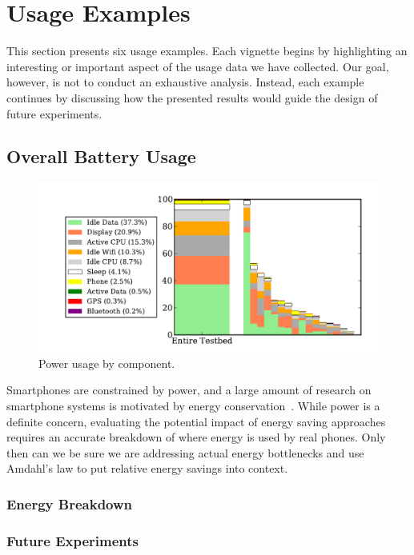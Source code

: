 \section{Usage Examples}
\label{sec-usage}

This section presents six \PhoneLab{} usage examples. Each vignette begins by
highlighting an interesting or important aspect of the usage data we have
collected. Our goal, however, is not to conduct an exhaustive analysis.
Instead, each example continues by discussing how the presented results would
guide the design of future \PhoneLab{} experiments.

\subsection{Overall Battery Usage}
\label{subsec-batteryoverview}

\begin{figure}[t]
\includegraphics[width=\textwidth]{./figures/power/breakdown/graph.pdf}
\caption{Power usage by component.}
\end{figure}

Smartphones are constrained by power, and a large amount of research on
smartphone systems is motivated by energy
conservation~\cite{FIXME,FIXME,FIXME}. While power is a definite concern,
evaluating the potential impact of energy saving approaches requires an
accurate breakdown of where energy is used by real phones. Only then can we
be sure we are addressing actual energy bottlenecks and use Amdahl's law to
put relative energy savings into context.

\subsubsection{Energy Breakdown}

\subsubsection{Future Experiments}

